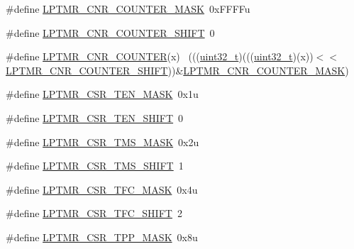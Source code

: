 \begin{DoxyCompactItemize}
\item 
\#define \hyperlink{group___l_p_t_m_r___register___masks_ga134708aff0fe3bd31d703e32966c08fc}{L\+P\+T\+M\+R\+\_\+\+C\+N\+R\+\_\+\+C\+O\+U\+N\+T\+E\+R\+\_\+\+M\+A\+SK}~0x\+F\+F\+F\+Fu
\item 
\#define \hyperlink{group___l_p_t_m_r___register___masks_ga3769a974a3d95250e32bb154fa134c3f}{L\+P\+T\+M\+R\+\_\+\+C\+N\+R\+\_\+\+C\+O\+U\+N\+T\+E\+R\+\_\+\+S\+H\+I\+FT}~0
\item 
\#define \hyperlink{group___l_p_t_m_r___register___masks_ga2acac25722b0527dbb388488e26850f3}{L\+P\+T\+M\+R\+\_\+\+C\+N\+R\+\_\+\+C\+O\+U\+N\+T\+ER}(x)                                      ~(((\hyperlink{_p_e___types_8h_a33594304e786b158f3fb30289278f5af}{uint32\+\_\+t})(((\hyperlink{_p_e___types_8h_a33594304e786b158f3fb30289278f5af}{uint32\+\_\+t})(x))$<$$<$\hyperlink{group___l_p_t_m_r___register___masks_ga3769a974a3d95250e32bb154fa134c3f}{L\+P\+T\+M\+R\+\_\+\+C\+N\+R\+\_\+\+C\+O\+U\+N\+T\+E\+R\+\_\+\+S\+H\+I\+FT}))\&\hyperlink{group___l_p_t_m_r___register___masks_ga134708aff0fe3bd31d703e32966c08fc}{L\+P\+T\+M\+R\+\_\+\+C\+N\+R\+\_\+\+C\+O\+U\+N\+T\+E\+R\+\_\+\+M\+A\+SK})
\item 
\#define \hyperlink{group___l_p_t_m_r___register___masks_ga4ed197f1cb8d0e954324b4854ff14a83}{L\+P\+T\+M\+R\+\_\+\+C\+S\+R\+\_\+\+T\+E\+N\+\_\+\+M\+A\+SK}~0x1u
\item 
\#define \hyperlink{group___l_p_t_m_r___register___masks_gada00f24f79b11a91e8404b4531d66733}{L\+P\+T\+M\+R\+\_\+\+C\+S\+R\+\_\+\+T\+E\+N\+\_\+\+S\+H\+I\+FT}~0
\item 
\#define \hyperlink{group___l_p_t_m_r___register___masks_ga57ee593a57d844d7bb4b87c127765558}{L\+P\+T\+M\+R\+\_\+\+C\+S\+R\+\_\+\+T\+M\+S\+\_\+\+M\+A\+SK}~0x2u
\item 
\#define \hyperlink{group___l_p_t_m_r___register___masks_gaeac406c6a48e15c6ec5784fb891b51b6}{L\+P\+T\+M\+R\+\_\+\+C\+S\+R\+\_\+\+T\+M\+S\+\_\+\+S\+H\+I\+FT}~1
\item 
\#define \hyperlink{group___l_p_t_m_r___register___masks_gaca581598c0f319b0002deda730479842}{L\+P\+T\+M\+R\+\_\+\+C\+S\+R\+\_\+\+T\+F\+C\+\_\+\+M\+A\+SK}~0x4u
\item 
\#define \hyperlink{group___l_p_t_m_r___register___masks_gaee3d1b59f30f6217f1f74b18cf973c4a}{L\+P\+T\+M\+R\+\_\+\+C\+S\+R\+\_\+\+T\+F\+C\+\_\+\+S\+H\+I\+FT}~2
\item 
\#define \hyperlink{group___l_p_t_m_r___register___masks_ga020eee1550f2943c10d51f8b56930e62}{L\+P\+T\+M\+R\+\_\+\+C\+S\+R\+\_\+\+T\+P\+P\+\_\+\+M\+A\+SK}~0x8u
$$
\end{DoxyCompactItemize}
